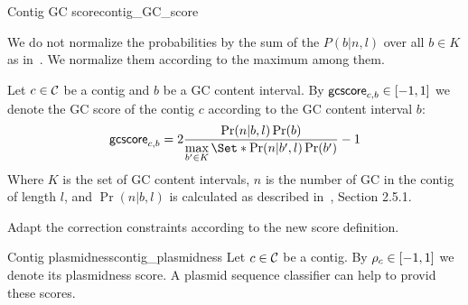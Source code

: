 \begin{definition}{Contig GC score}{contig_GC_score}
  \begin{newfeatbox}
    We do not normalize the probabilities by the sum of the \(P(b|n,l)\) over all \(b \in K\) as in~\cite{manePlasBinflowFlowbasedMILP2023}. We normalize them according to the maximum among them.
  \end{newfeatbox}
  Let \(c \in \mathcal{C}{}\) be a contig and \(b\) be a GC content interval.
  By \(\mathsf{gcscore}_{c, b} \in [-1, 1]\) we denote the GC score of the contig \(c\) according to the GC content interval \(b\):
  \[
    \gcscore{c}{b} = 2 \frac{\Pr(n|b,l)\Pr(b)}{\max\limits_{b' \in K}\Set*{\Pr(n|b',l)\Pr(b')}} - 1
  \]
  Where \(K\) is the set of GC content intervals, \(n\) is the number of GC in the contig of length \(l\), and \(\Pr(n|b,l)\) is calculated as described in~\cite{manePlasBinflowFlowbasedMILP2023}, Section 2.5.1.

  \begin{fixmebox}
    Adapt the correction constraints according to the new score definition.
  \end{fixmebox}
\end{definition}

\begin{definition}{Contig plasmidness}{contig_plasmidness}
  Let \(c \in \mathcal{C}{}\) be a contig.
  By \(\rho_{c} \in [-1, 1]\) we denote its plasmidness score.
  A plasmid sequence classifier can help to provid these scores.
\end{definition}